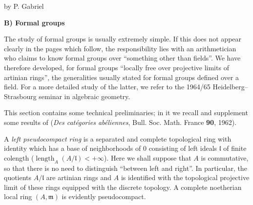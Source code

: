 \label{VIIB}
\begin{center}by P. Gabriel\end{center}
\begin{center}\textbf{B) Formal groups}\end{center}
\setcounter{footnote}{-1}
The study of formal groups is usually extremely simple. If this does not appear clearly in the pages which follow, the responsibility lies with an arithmetician who claims to know formal groups over ``something other than fields''. We have therefore developed, for formal groups ``locally free over projective limits of artinian rings'', the generalities usually stated for formal groups defined over a field. For a more detailed study of the latter, we refer to the 1964/65 Heidelberg--Strasbourg seminar in algebraic geometry.

This section contains some technical preliminaries; in it we recall and supplement some results of \cite{CA} (\textit{Des catégories abéliennes}, Bull. Soc. Math. France \textbf{90}, 1962).

A \emph{left pseudocompact ring} is a separated and complete topological ring with identity which has a base of neighborhoods of $0$ consisting of left ideals $\mathfrak l$ of finite colength (\ie $\operatorname{length}_A(A/\mathfrak l)<+\infty$). Here we shall suppose that $A$ is commutative, so that there is no need to distinguish ``between left and right''.
In particular, the quotients $A/\mathfrak l$ are artinian rings and $A$ is identified with the topological projective limit of these rings equipped with the discrete topology.
A complete noetherian local ring $(A,\mathfrak m)$ is evidently pseudocompact.

